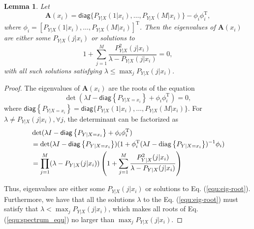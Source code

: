 \documentclass{article} %
\theoremstyle{plain} %
\newtheorem{lemma}[theorem]{Lemma}          %
\begin{document}
\begin{lemma}\label{lem:spectrum}
Let 
\[
\textbf{A}(x_i) = \mathsf{diag}\{P_{Y|X}(1|x_i),\dots,P_{Y|X}(M|x_i)\}-\phi_i\phi_i^\mathrm{T},
\]
where $\phi_i = [P_{Y|X}(1|x_i),\dots,P_{Y|X}(M|x_i)]^\mathrm{T}$. 
Then the eigenvalues of $\textbf{A}(x_i)$ are either some $P_{Y|X}(j|x_i)$ or solutions to
\begin{equation}\label{equ:eig-root}
1+\sum_{j=1}^M \frac{P_{Y|X}^2(j|x_i)}{\lambda - P_{Y|X}(j|x_i)}=0,
\end{equation}
with all such solutions satisfying $\lambda \leq \max_j P_{Y|X}(j|x_i)$.
\end{lemma}
\begin{proof}
The eigenvalues of $\textbf{A}(x_i)$ are the roots of the equation 
\begin{equation}\label{equ:spectrum_equ}
\det(\lambda I- \mathsf{diag}\left\{ P_{Y|X=x_i} \right\} + \phi_i\phi_i^\mathrm{T})=0, 
\end{equation}
where $\mathsf{diag}\left\{ P_{Y|X=x_i} \right\}=\mathsf{diag}\{P_{Y|X}(1|x_i),\dots,P_{Y|X}(M|x_i)\}$. 
For $\lambda\ne P_{Y|X}(j|x_i),\forall j$, the determinant can be factorized as
\begin{align*}
&\det(\lambda I- {\mathsf{diag}}\left\{ P_{Y|X=x_i} \right\} + \phi_i\phi_i^\mathrm{T})
\\
&= \det(\lambda I- {\mathsf{diag}}\left\{ P_{Y|X=x_i} \right\} )(1+ \phi_i^\mathrm{T}(\lambda I- {\rm diag}\left\{ P_{Y|X=x_i} \right\})^{-1}\phi_i)\\
&= \prod_{j=1}^M(\lambda-P_{Y|X}(j|x_i))\left(1+\sum_{j=1}^M\frac{P_{Y|X}^2(j|x_i)}{\lambda-P_{Y|X}(j|x_i)} \right)\end{align*}

Thus, eigenvalues are either some $P_{Y|X}(j|x_i)$ or solutions to Eq. (\ref{equ:eig-root}).
Furthermore, we have that all the solutions $\lambda$ to the Eq. (\ref{equ:eig-root}) must satisfy that $\lambda < \max_j P_{Y|X}(j|x_i)$, which makes all roots of Eq. (\ref{equ:spectrum_equ}) no larger than $\max_j P_{Y|X}(j|x_i)$.
\end{proof}
\end{document}
